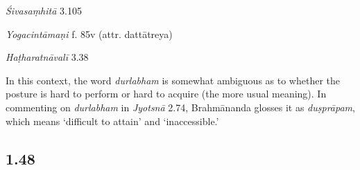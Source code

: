 \begin{ekdosis}
\begin{sources}[hp01_047]
\begin{versinnote}
\end{versinnote}

\emph{Śivasaṃhitā} 3.105

\begin{versinnote}
\end{versinnote}

\end{sources}

\begin{testimonia}[hp01_047]
\emph{Yogacintāmaṇi} f. 85v (attr. dattātreya)

\begin{versinnote}
\end{versinnote}

\emph{Haṭharatnāvalī} 3.38

\begin{versinnote}
\end{versinnote}

\end{testimonia}

\begin{philcomm}[hp01_047]
In this context, the word \emph{durlabham} is somewhat ambiguous as to whether the posture is hard to perform or hard to acquire (the more usual meaning). In commenting on \emph{durlabham} in \emph{Jyotsnā} 2.74, Brahmānanda glosses it as \emph{duṣprāpam}, which means `difficult to attain' and `inaccessible.' 
\end{philcomm}

\subsection*{1.48}
\begin{translation}[hp01_048]


\end{translation}
\end{ekdosis}
